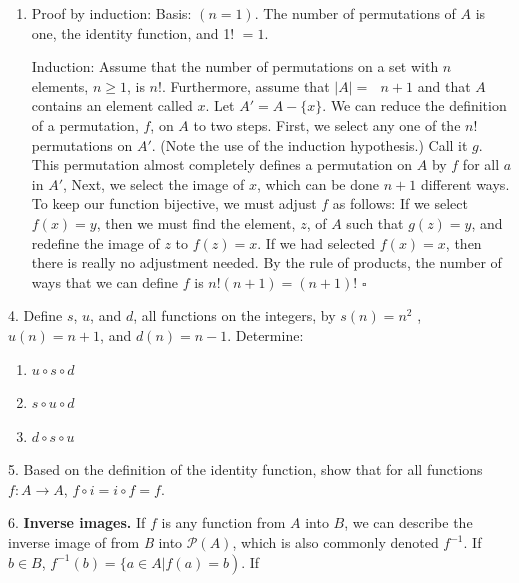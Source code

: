 \documentclass[10pt,]{book}
\newcommand{\terminology}[1]{\textbf{#1}}
\theoremstyle{plain}
\theoremstyle{definition}
\theoremstyle{definition}
\theoremstyle{definition}
\begin{document}
\begin{exercisegroup}
\begin{enumerate}[label=\alph*]
\item\hypertarget{li-86}{} Proof by induction: Basis: \((n=1)\).  The number of permutations of \(A\) is one, the identity function, and 1! \(=1\).%
\par
Induction: Assume that the number of permutations on a set with \(n\) elements,
 \(n\geq 1\), is \(n\)!. Furthermore, assume that \(|A|=\)\(\text{  }n+1\) and that \(A\) contains
  an element called \(x\). Let \(A'=A-\{x\}\). We can reduce the definition of a permutation, \(f\),
   on \(A\) to two steps. First, we select any one of the \(n\)! permutations on \(A'\).
    (Note the use of the induction hypothesis.) Call it \(g\). This permutation almost
     completely defines a permutation on \(A\) by \(f\) for all
      \(a\) in \(A'\), Next, we select the image of \(x\), which can be done \(n+1\) different ways.
       To keep our function bijective, we must adjust \(f\) as follows: If we select \(f(x)=y\),
        then we must find the element, \(z\), of \(A\) such that \(g(z)=y\), and redefine the image
         of \(z\) to \(f(z)=x\). If we had selected \(f(x)=x\), then there is really no adjustment needed.
          By the rule of products, the number of ways that we can define \(f\) is \(n!(n+1)=(n+1)!\) \(\square\)%
\end{enumerate}
%
\item[4.]\hypertarget{exercise-26}{} Define \(s\), \(u\), and \(d\), all functions on the integers, by \(s(n) = n^2\) , \(u(n) = n + 1\), and \(d(n) = n-1\). Determine:%
\par
\leavevmode%
\begin{enumerate}[label=\alph*]
\item\hypertarget{li-87}{} \(u \circ  s \circ  d\)%
\item\hypertarget{li-88}{} \(s \circ  u\circ  d\)%
\item\hypertarget{li-89}{} \(d \circ  s \circ  u\)%
\end{enumerate}
%
\par\smallskip
\item[5.]\hypertarget{exercise-27}{} Based on the definition of the identity function, show that for all functions \(f:A\to A\), \(f\circ i=i\circ f = f\).%
\par\smallskip
\item[6.]\hypertarget{exercise-28}{}\terminology{Inverse images.} If \(f\) is any function from \(A\) into \(B\), we can describe the inverse image of from \textit{
B }into \(\mathcal{P}(A)\), which is also commonly denoted \(f^{-1}\). If \(b \in  B\), \(\left.f^{-1}(b) = \{a \in A | f(a) = b\right)\). If

\end{exercisegroup}
\end{document}
